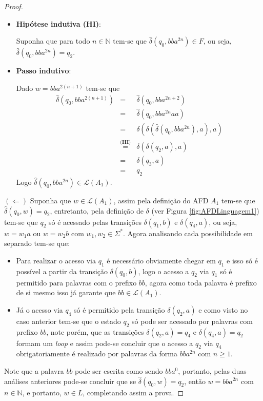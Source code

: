\begin{example}
\begin{proof}
\begin{itemize}
			\item \textbf{Hipótese indutiva (HI)}:
			
			Suponha que para todo $n \in \mathbb{N}$ tem-se que $\widehat{\delta}(q_0, bba^{2n}) \in F$, ou seja, $\widehat{\delta}(q_0, bba^{2n}) = q_2$.
			
			\item \textbf{Passo indutivo}:
			
			Dado $w = bba^{2(n+1)}$ tem-se que
			\begin{eqnarray*}
				\widehat{\delta}(q_0, bba^{2(n+1)}) & = & \widehat{\delta}(q_0, bba^{2n + 2})\\
				& = & \widehat{\delta}(q_0, bba^{2n}aa)\\
				& = & \delta(\delta(\widehat{\delta}(q_0, bba^{2n}), a), a)\\
				& \stackrel{\textbf{(HI)}}{=} & \delta(\delta(q_2, a), a)\\
				& = & \delta(q_3, a)\\
				& = & q_2
			\end{eqnarray*} 
			Logo $\widehat{\delta}(q_0, bba^{2n}) \in \mathcal{L}(A_1)$.
		\end{itemize} 
		$(\Leftarrow)$ Suponha que $w \in \mathcal{L}(A_1)$, assim pela definição do AFD $A_1$ tem-se que $\widehat{\delta}(q_0, w) = q_2$, entretanto, pela definição de $\delta$ (ver Figura \ref{fig:AFDLinguagem1}) tem-se que $q_2$ só é acessado pelas transições $\delta(q_1, b)$ e $\delta(q_4, a)$, ou seja, $w = w_1a$ ou $w = w_2b$ com $w_1, w_2 \in \Sigma^*$. Agora analisando cada possibilidade em separado tem-se que: 
		\begin{itemize}
			\item Para realizar o acesso via $q_1$ é necessário obviamente chegar em $q_1$ e isso só é possível a partir da transição $\delta(q_0, b)$, logo o acesso a $q_2$ via $q_1$ só é permitido para palavras com o prefixo $bb$, agora como toda palavra é prefixo de si mesmo isso já garante que $bb \in \mathcal{L}(A_1)$.
			\item Já o acesso via $q_4$ só é permitido pela transição $\delta(q_2, a)$ e como visto no caso anterior tem-se que o estado $q_2$ só pode ser acessado por palavras com prefixo $bb$, note porém, que as transições $\delta(q_2, a) = q_4$ e $\delta(q_4, a) = q_2$ formam um \textit{loop} e assim pode-se concluir que o acesso a $q_2$ via $q_4$ obrigatoriamente é realizado por palavras da forma $bba^{2n}$ com $n \geq 1$.
		\end{itemize}
		Note que a palavra $bb$ pode ser escrita como sendo $bba^0$, portanto, pelas duas análises anteriores pode-se concluir que se $\widehat{\delta}(q_0, w) = q_2$, então $w = bba^{2n}$ com $n \in \mathbb{N}$, e portanto, $w \in L$, completando assim a prova. 
	\end{proof}
\end{example}

